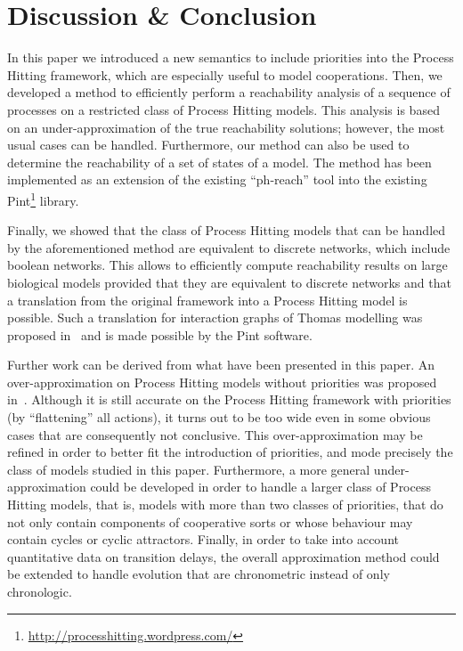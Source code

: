 \section{Discussion \& Conclusion}\label{sec:ccl}

In this paper we introduced a new semantics to include priorities into the Process Hitting framework, which are especially useful to model cooperations.
Then, we developed a method to efficiently perform a reachability analysis of a sequence of processes on a restricted class of Process Hitting models.
This analysis is based on an under-approximation of the true reachability solutions; however, the most usual cases can be handled.
Furthermore, our method can also be used to determine the reachability of a set of states of a model.
The method has been implemented as an extension of the existing “ph-reach” tool into the existing Pint\footnote{\url{http://processhitting.wordpress.com/}} library.

Finally, we showed that the class of Process Hitting models that can be handled by the aforementioned method are equivalent to discrete networks, which include boolean networks.
This allows to efficiently compute reachability results on large biological models provided that they are equivalent to discrete networks and that a translation from the original framework into a Process Hitting model is possible.
Such a translation for interaction graphs of Thomas modelling was proposed in~\cite{PMR10-TCSB} and is made possible by the Pint software.

Further work can be derived from what have been presented in this paper.
An over-approximation on Process Hitting models without priorities was proposed in~\cite{PMR12-MSCS}.
Although it is still accurate on the Process Hitting framework with priorities (by “flattening” all actions),
it turns out to be too wide even in some obvious cases that are consequently not conclusive.
This over-approximation may be refined in order to better fit the introduction of priorities, and mode precisely the class of models studied in this paper.
Furthermore, a more general under-approximation could be developed in order to handle a larger class of Process Hitting models, that is,
models with more than two classes of priorities, that do not only contain components of cooperative sorts or whose behaviour may contain cycles or cyclic attractors.
Finally, in order to take into account quantitative data on transition delays, the overall approximation method could be extended to handle evolution that are chronometric instead of only chronologic.
